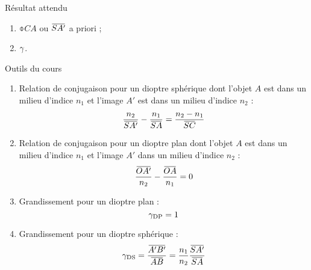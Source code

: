 \documentclass[10pt,a5paper,notitlepage]{book}
\begin{document}
\begin{NCprop}{Résultat attendu}
    \begin{enumerate}
        \item $\obar{CA}$ ou $\SAp$ a priori ;
        \item $\gamma$.
    \end{enumerate}
\end{NCprop}

\begin{NCdemo}{Outils du cours}
    \begin{enumerate}
        \item Relation de conjugaison pour un dioptre sphérique dont l'objet
            $A$ est dans un milieu d'indice $n_1$ et l'image $A'$ est dans un
            milieu d'indice $n_2$ :
            \[ \frac{n_2}{\SAp} - \frac{n_1}{\SA} = \frac{n_2 - n_1}{\SC}\]
        \item Relation de conjugaison pour un dioptre plan dont l'objet $A$ est
            dans un milieu d'indice $n_1$ et l'image $A'$ dans un milieu
            d'indice $n_2$ :
            \[ \frac{\OAp}{n_2} - \frac{\OA}{n_1} = 0 \]
        \item Grandissement pour un dioptre plan :
            \[ \gamma _{\text{DP}} = 1 \]
        \item Grandissement pour un dioptre sphérique :
            \[ \g \St{DS} = \frac{\ABp}{\ABb} = \frac{n_1}{n_2}
            \frac{\SAp}{\SA}\]
    \end{enumerate}
\end{NCdemo}
\end{document}
